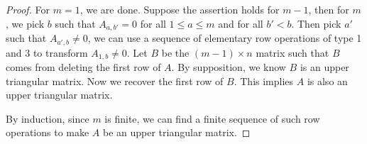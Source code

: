 \begin{Exercise}
\begin{proof}
For $m=1$, we are done. Suppose the assertion holds for $m-1$, then for $m$, we pick $b$ such that $A_{a,b'} = 0$ for all $1\leq a \leq m$ and for all $b'<b$. Then pick $a'$ such that $A_{a',b}\neq 0$, we can use a sequence of elementary row operations of type 1 and 3 to transform $A_{1, b}\neq 0$. Let $B$ be the $(m-1)\times n$ matrix such that $B$ comes from deleting the first row of $A$. By supposition, we know $B$ is an upper triangular matrix. Now we recover the first row of $B$. This implies $A$ is also an upper triangular matrix.

By induction, since $m$ is finite, we can find a finite sequence of such row operations to make $A$ be an upper triangular matrix.
\end{proof}
\end{Exercise}